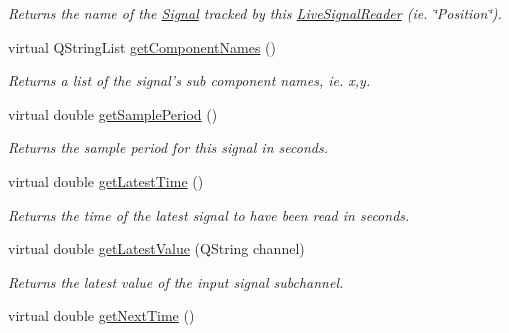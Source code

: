 \begin{DoxyCompactItemize}
\begin{DoxyCompactList}\small\item\em Returns the name of the \hyperlink{class_picto_1_1_signal}{Signal} tracked by this \hyperlink{class_picto_1_1_live_signal_reader}{Live\-Signal\-Reader} (ie. \char`\"{}\-Position\char`\"{}). \end{DoxyCompactList}\item 
\hypertarget{class_picto_1_1_live_signal_reader_af1233a4748817eb0faf6ca4eafa7034a}{virtual Q\-String\-List \hyperlink{class_picto_1_1_live_signal_reader_af1233a4748817eb0faf6ca4eafa7034a}{get\-Component\-Names} ()}\label{class_picto_1_1_live_signal_reader_af1233a4748817eb0faf6ca4eafa7034a}

\begin{DoxyCompactList}\small\item\em Returns a list of the signal's sub component names, ie. x,y. \end{DoxyCompactList}\item 
\hypertarget{class_picto_1_1_live_signal_reader_abb52c81093f823ec84d7714358f61cb7}{virtual double \hyperlink{class_picto_1_1_live_signal_reader_abb52c81093f823ec84d7714358f61cb7}{get\-Sample\-Period} ()}\label{class_picto_1_1_live_signal_reader_abb52c81093f823ec84d7714358f61cb7}

\begin{DoxyCompactList}\small\item\em Returns the sample period for this signal in seconds. \end{DoxyCompactList}\item 
\hypertarget{class_picto_1_1_live_signal_reader_a32a3c63f8c9d18dc0799043a7a6f7784}{virtual double \hyperlink{class_picto_1_1_live_signal_reader_a32a3c63f8c9d18dc0799043a7a6f7784}{get\-Latest\-Time} ()}\label{class_picto_1_1_live_signal_reader_a32a3c63f8c9d18dc0799043a7a6f7784}

\begin{DoxyCompactList}\small\item\em Returns the time of the latest signal to have been read in seconds. \end{DoxyCompactList}\item 
\hypertarget{class_picto_1_1_live_signal_reader_a428e5e12216031c80df460b8b6ea102c}{virtual double \hyperlink{class_picto_1_1_live_signal_reader_a428e5e12216031c80df460b8b6ea102c}{get\-Latest\-Value} (Q\-String channel)}\label{class_picto_1_1_live_signal_reader_a428e5e12216031c80df460b8b6ea102c}

\begin{DoxyCompactList}\small\item\em Returns the latest value of the input signal subchannel. \end{DoxyCompactList}\item 
\hypertarget{class_picto_1_1_live_signal_reader_a7196ba22a8c537c58f77baf99c252e43}{virtual double \hyperlink{class_picto_1_1_live_signal_reader_a7196ba22a8c537c58f77baf99c252e43}{get\-Next\-Time} ()}\label{class_picto_1_1_live_signal_reader_a7196ba22a8c537c58f77baf99c252e43}


\end{DoxyCompactItemize}
